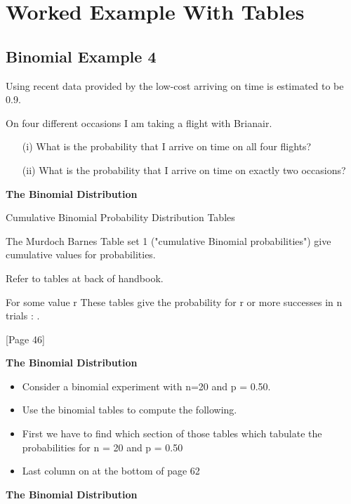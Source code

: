 \documentclass[]{report}
\begin{document}
\section{Worked Example With Tables}



\subsection{Binomial Example 4 }Using recent data provided by the low-cost
arriving on time is estimated to be 0.9.

On four different occasions I am taking a flight with Brianair.
\begin{itemize}
\item[(i)] What is the probability that I arrive on time on all four flights?
\item[(ii)] What is the probability that I arrive on time on exactly two occasions?
\end{itemize}


\textbf{The Binomial Distribution}


Cumulative Binomial Probability Distribution Tables

The Murdoch Barnes Table set 1 ("cumulative Binomial probabilities") give cumulative values for probabilities.

Refer to tables at back of handbook.

For some value  r These tables give the probability for r or more successes in n trials :  .

[Page 46]



\textbf{The Binomial Distribution}


\begin{itemize}
\item Consider a binomial experiment with n=20 and p = 0.50.
\item Use the binomial tables to compute the following.
\item First we have to find which section of those tables which tabulate the probabilities for n = 20 and p = 0.50
\item Last column on at the bottom of page 62
\end{itemize}



\textbf{The Binomial Distribution}
\end{document}
